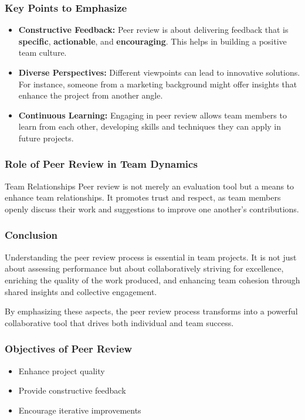\documentclass{beamer}
\begin{document}
\begin{frame}[fragile]
    \frametitle{Key Points to Emphasize}
    \begin{itemize}
        \item \textbf{Constructive Feedback:} 
            Peer review is about delivering feedback that is \textbf{specific}, \textbf{actionable}, and \textbf{encouraging}. 
            This helps in building a positive team culture.
        
        \item \textbf{Diverse Perspectives:} 
            Different viewpoints can lead to innovative solutions. 
            For instance, someone from a marketing background might offer insights that enhance the project from another angle.
        
        \item \textbf{Continuous Learning:} 
            Engaging in peer review allows team members to learn from each other, developing skills and techniques they can apply in future projects.
    \end{itemize}
\end{frame}

\begin{frame}[fragile]
    \frametitle{Role of Peer Review in Team Dynamics}
    \begin{block}{Team Relationships}
        Peer review is not merely an evaluation tool but a means to enhance team relationships. 
        It promotes trust and respect, as team members openly discuss their work and suggestions to improve one another’s contributions.
    \end{block}
\end{frame}

\begin{frame}[fragile]
    \frametitle{Conclusion}
    Understanding the peer review process is essential in team projects. 
    It is not just about assessing performance but about collaboratively striving for excellence, enriching the quality of the work produced, and enhancing team cohesion through shared insights and collective engagement.
    
    By emphasizing these aspects, the peer review process transforms into a powerful collaborative tool that drives both individual and team success.
\end{frame}

\begin{frame}[fragile]
    \frametitle{Objectives of Peer Review}
    \begin{itemize}
        \item Enhance project quality
        \item Provide constructive feedback
        \item Encourage iterative improvements
    \end{itemize}
\end{frame}
\end{document}
